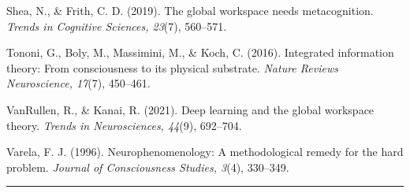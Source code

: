 \documentclass[
  11pt,
]{article}
\begin{document}
Shea, N., \& Frith, C. D. (2019). The global workspace needs
metacognition. \emph{Trends in Cognitive Sciences, 23}(7), 560--571.

Tononi, G., Boly, M., Massimini, M., \& Koch, C. (2016). Integrated
information theory: From consciousness to its physical substrate.
\emph{Nature Reviews Neuroscience, 17}(7), 450--461.

VanRullen, R., \& Kanai, R. (2021). Deep learning and the global
workspace theory. \emph{Trends in Neurosciences, 44}(9), 692--704.

Varela, F. J. (1996). Neurophenomenology: A methodological remedy for
the hard problem. \emph{Journal of Consciousness Studies, 3}(4),
330--349.

\begin{center}\rule{0.5\linewidth}{0.5pt}\end{center}
\end{document}
